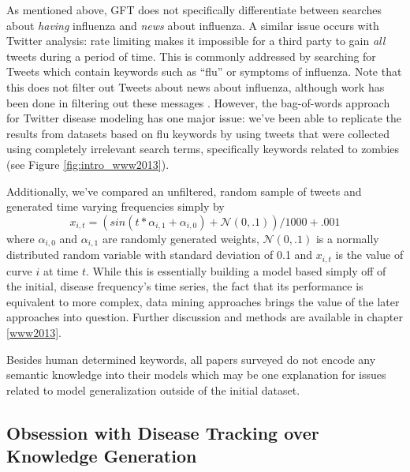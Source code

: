 As mentioned above, GFT does not specifically differentiate between searches about \emph{having} influenza and \emph{news} about influenza. A similar issue occurs with Twitter analysis: rate limiting makes it impossible for a third party to gain \emph{all} tweets during a period of time. This is commonly addressed by searching for Tweets which contain keywords such as ``flu'' or symptoms of influenza. Note that this does not filter out Tweets about news about influenza, although work has been done in filtering out these messages \cite{culotta2010towards,lamb2013separating}. However, the bag-of-words approach for Twitter disease modeling has one major issue: we've been able to replicate the results from datasets based on flu keywords by using tweets that were collected using completely irrelevant search terms, specifically keywords related to zombies (see Figure \ref{fig:intro_www2013}).

Additionally, we've compared an unfiltered, random sample of tweets and generated time varying frequencies simply by 
\begin{equation}
x_{i,t} = (sin(t*\alpha_{i,1} + \alpha_{i,0})+\mathcal{N}(0,.1))/1000 + .001
\end{equation}
where \(\alpha_{i,0}\) and \(\alpha_{i,1}\) are randomly generated weights, \(\mathcal{N}(0,.1)\) is a normally distributed random variable with standard deviation of 0.1 and \(x_{i,t}\) is the value of curve \(i\) at time \(t\). While this is essentially building a model based simply off of the initial, disease frequency's time series, the fact that its performance is equivalent to more complex, data mining approaches brings the value of the later approaches into question. Further discussion and methods are available in chapter \ref{www2013}.

Besides human determined keywords, all papers surveyed do not encode any semantic knowledge into their models which may be one explanation for issues related to model generalization outside of the initial dataset.


\subsection{Obsession with Disease Tracking over Knowledge Generation}

